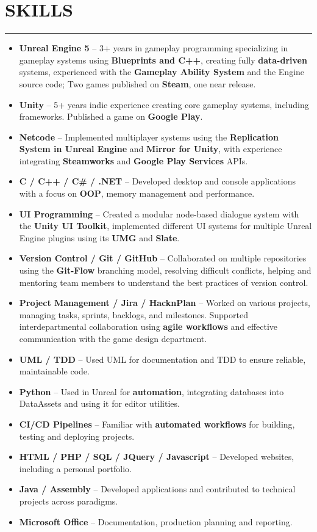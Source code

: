 \documentclass[7pt]{article}
\newcommand{\sectionline}{\vspace{-0.3em}\noindent\rule{\linewidth}{0.15pt}\vspace{0.08em}}
\newcommand{\cvsection}[2]{%
    \vspace{-.6em}
    \section*{{\large\textbf{\MakeUppercase{#1}}}}
    \vspace{-0.5em}
    \sectionline
    \vspace{-0.15em}
    #2
}
\begin{document}
    \cvsection{SKILLS}{
        \begin{itemize}[noitemsep, topsep=0pt, parsep=0pt, partopsep=0pt, itemsep=0pt, leftmargin=*]
            \item \textbf{Unreal Engine 5} – 3+ years in gameplay programming specializing in gameplay systems using \textbf{Blueprints and C++}, creating fully \textbf{data-driven} systems,  experienced with the \textbf{Gameplay Ability System} and the Engine source code; Two games published on \textbf{Steam}, one near release.
            \item \textbf{Unity} – 5+ years indie experience creating core gameplay systems, including frameworks. Published a game on \textbf{Google Play}.
            \item \textbf{Netcode} – Implemented multiplayer systems using the \textbf{Replication System in Unreal Engine} and \textbf{Mirror for Unity}, with experience integrating \textbf{Steamworks} and \textbf{Google Play Services} APIs.
            \item \textbf{C / C++ / C\# / .NET} – Developed desktop and console applications with a focus on \textbf{OOP}, memory management and performance.
            \item \textbf{UI Programming} – Created a modular node-based dialogue system with the \textbf{Unity UI Toolkit}, implemented different UI systems for multiple Unreal Engine plugins using its \textbf{UMG} and \textbf{Slate}.
            \item \textbf{Version Control / Git / GitHub} – Collaborated on multiple repositories using the \textbf{Git-Flow} branching model, resolving difficult conflicts, helping and mentoring team members to understand the best practices of version control.
            \item \textbf{Project Management / Jira / HacknPlan} – Worked on various projects, managing tasks, sprints, backlogs, and milestones. Supported interdepartmental collaboration using \textbf{agile workflows} and effective communication with the game design department.
            \item \textbf{UML / TDD} – Used UML for documentation and TDD to ensure reliable, maintainable code.
            \item \textbf{Python} – Used in Unreal for \textbf{automation}, integrating databases into DataAssets and using it for editor utilities.
            \item \textbf{CI/CD Pipelines} – Familiar with \textbf{automated workflows} for building, testing and deploying projects.
            \item \textbf{HTML / PHP / SQL / JQuery / Javascript} – Developed websites, including a personal portfolio.
            \item \textbf{Java / Assembly} – Developed applications and contributed to technical projects across paradigms.
            \item \textbf{Microsoft Office} – Documentation, production planning and reporting.
        \end{itemize}
    }
\end{document}
